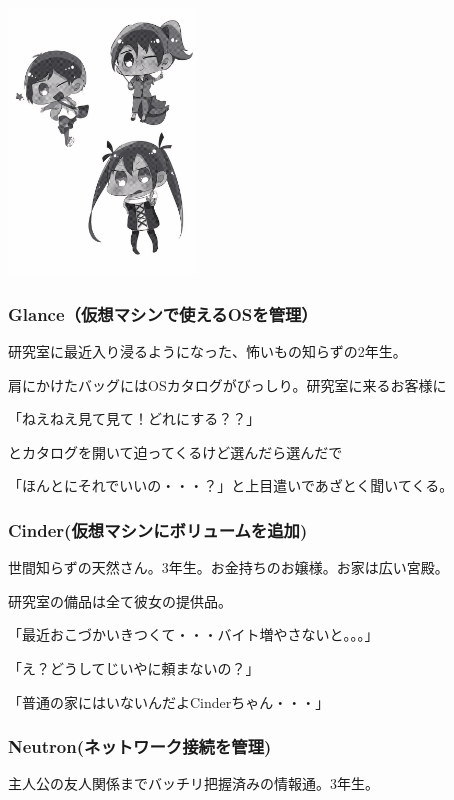\documentclass[9pt,b5paper,tombo,openany]{jsbook}
\begin{document}
\begin{floatingfigure}[r]{5cm}
  \includegraphics[width=5cm]{./img/char2.pdf}
\end{floatingfigure}

\subsubsection{Glance（仮想マシンで使えるOSを管理）}

研究室に最近入り浸るようになった、怖いもの知らずの2年生。

肩にかけたバッグにはOSカタログがびっしり。研究室に来るお客様に

「ねえねえ見て見て！どれにする？？」

とカタログを開いて迫ってくるけど選んだら選んだで

「ほんとにそれでいいの・・・？」と上目遣いであざとく聞いてくる。

\subsubsection{Cinder(仮想マシンにボリュームを追加)}

世間知らずの天然さん。3年生。お金持ちのお嬢様。お家は広い宮殿。

研究室の備品は全て彼女の提供品。

「最近おこづかいきつくて・・・バイト増やさないと。。。」

「え？どうしてじいやに頼まないの？」

「普通の家にはいないんだよCinderちゃん・・・」

\subsubsection{Neutron(ネットワーク接続を管理)}

主人公の友人関係までバッチリ把握済みの情報通。3年生。
\end{document}
